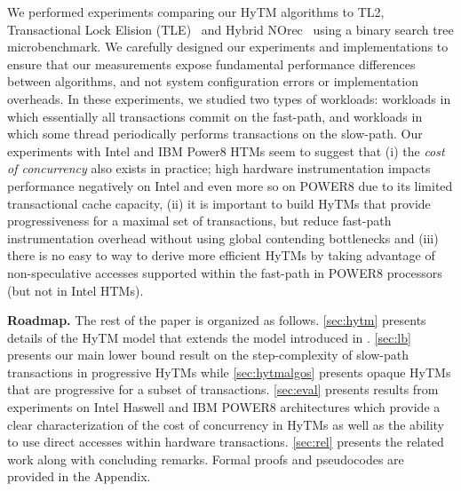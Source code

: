 We performed experiments comparing our HyTM algorithms to TL2, Transactional Lock Elision (TLE)~\cite{tle} and Hybrid NOrec~\cite{hynorecriegel} 
using a binary search tree microbenchmark.
We carefully designed our experiments and implementations to ensure that our measurements expose fundamental performance differences between algorithms, and not system configuration errors or implementation overheads.
In these experiments, we studied two types of workloads: workloads in which essentially all transactions commit on the fast-path, 
and workloads in which some thread periodically performs transactions on the slow-path.
Our experiments with Intel and IBM Power8 HTMs   
seem to suggest that (i) the \emph{cost of concurrency} also exists in practice; high hardware instrumentation impacts performance negatively on Intel and even more so on POWER8 due to its limited transactional
cache capacity, (ii) 
it is important to build HyTMs that provide progressiveness for a maximal set of transactions, but reduce fast-path instrumentation overhead
without using global contending bottlenecks and (iii) 
there is no easy to way to derive more efficient HyTMs by taking advantage of non-speculative accesses supported within the fast-path in POWER8 processors
(but not in Intel HTMs).

\vspace{1mm}\noindent\textbf{Roadmap.}
The rest of the paper is organized as follows.
\cref{sec:hytm} presents details of the HyTM model that extends the model introduced in \cite{htmdisc15}.
\cref{sec:lb} presents our main lower bound result on the step-complexity of slow-path transactions in progressive HyTMs
while \cref{sec:hytmalgos} presents opaque HyTMs that are progressive for a subset of transactions.
\cref{sec:eval} presents results from experiments on Intel Haswell and IBM POWER8 architectures which provide a clear characterization of the cost
of concurrency in HyTMs as well as the ability to use direct accesses within hardware transactions.
\cref{sec:rel} presents the related work along with concluding remarks. Formal proofs and pseudocodes are provided in the Appendix.
%